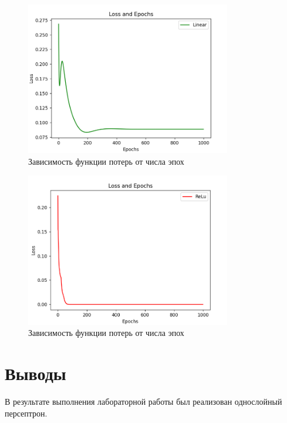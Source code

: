 \documentclass[a4paper, 14pt]{extarticle}
\begin{document}
\begin{figure}[!htb]
	\centering
	\includegraphics[width=0.8\textwidth]{img5}
\caption{Зависимость функции потерь от числа эпох}
\label{fig:img5}
\end{figure}

\begin{figure}[!htb]
	\centering
	\includegraphics[width=0.8\textwidth]{img6}
\caption{Зависимость функции потерь от числа эпох}
\label{fig:img6}
\end{figure}

\section{Выводы}\label{Sect::conclusion}

В результате выполнения лабораторной работы был реализован однослойный персептрон.
\end{document}
